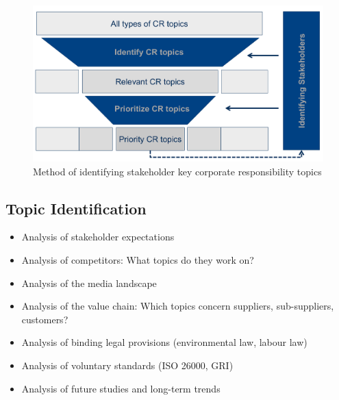 \documentclass[11pt]{article}
\theoremstyle{definition}
\begin{document}
\begin{figure}[H]
	\centering
	\includegraphics[width=0.6\linewidth]{img/corporate_responsibility_topic_selection}
	\caption{Method of identifying stakeholder key corporate responsibility topics}
	\label{fig:corporateresponsibilitytopicselection}
\end{figure}

\subsection{Topic Identification}
\begin{itemize}[nosep]
	\item Analysis of stakeholder expectations
	\item Analysis of competitors: What topics do they work on?
	\item Analysis of the media landscape
	\item Analysis of the value chain: Which topics concern suppliers, sub-suppliers, customers?
	\item Analysis of binding legal provisions (environmental law, labour law)
	\item Analysis of voluntary standards (ISO 26000, GRI)
	\item Analysis of future studies and long-term trends
\end{itemize}
\end{document}
